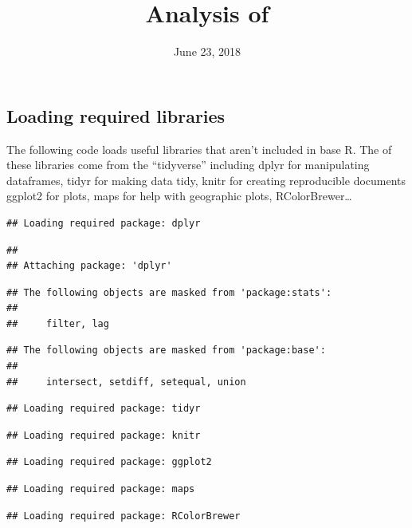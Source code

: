 \documentclass[]{article}
\title{Analysis of}
\author{}
\date{June 23, 2018}
\begin{document}
\maketitle

\subsection{Loading required
libraries}\label{loading-required-libraries}

The following code loads useful libraries that aren't included in base
R. The of these libraries come from the ``tidyverse'' including dplyr
for manipulating dataframes, tidyr for making data tidy, knitr for
creating reproducible documents ggplot2 for plots, maps for help with
geographic plots, RColorBrewer\ldots{}

\begin{verbatim}
## Loading required package: dplyr
\end{verbatim}

\begin{verbatim}
## 
## Attaching package: 'dplyr'
\end{verbatim}

\begin{verbatim}
## The following objects are masked from 'package:stats':
## 
##     filter, lag
\end{verbatim}

\begin{verbatim}
## The following objects are masked from 'package:base':
## 
##     intersect, setdiff, setequal, union
\end{verbatim}

\begin{verbatim}
## Loading required package: tidyr
\end{verbatim}

\begin{verbatim}
## Loading required package: knitr
\end{verbatim}

\begin{verbatim}
## Loading required package: ggplot2
\end{verbatim}

\begin{verbatim}
## Loading required package: maps
\end{verbatim}

\begin{verbatim}
## Loading required package: RColorBrewer
\end{verbatim}
\end{document}

